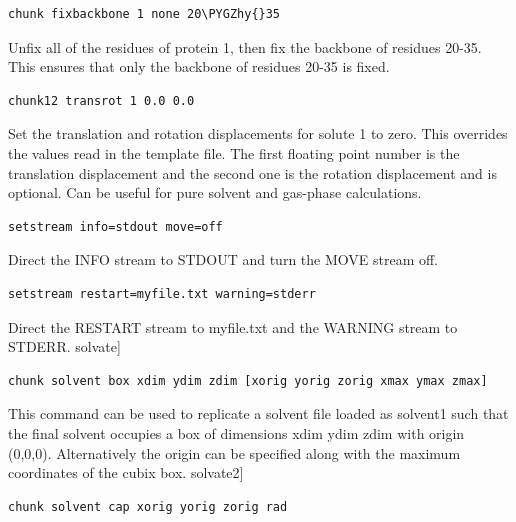\documentclass[letterpaper,10pt,english]{sphinxmanual}
\def\PYGZhy{\char`\-}
\begin{document}
\begin{Verbatim}[commandchars=\\\{\}]
chunk fixbackbone 1 none 20\PYGZhy{}35
\end{Verbatim}

Unfix all of the residues of protein 1, then fix the backbone of residues 20-35. This ensures that only the backbone of residues 20-35 is fixed.

\begin{Verbatim}[commandchars=\\\{\}]
chunk12 transrot 1 0.0 0.0
\end{Verbatim}

Set the translation and rotation displacements for solute 1 to zero. This overrides the values read in the template file. The first floating point number is the translation displacement and the second one is the rotation displacement and is optional. Can be useful for pure solvent and gas-phase calculations.

\begin{Verbatim}[commandchars=\\\{\}]
setstream info=stdout move=off
\end{Verbatim}

Direct the INFO stream to STDOUT and turn the MOVE stream off.

\begin{Verbatim}[commandchars=\\\{\}]
setstream restart=myfile.txt warning=stderr
\end{Verbatim}

Direct the RESTART stream to myfile.txt and the WARNING stream to STDERR. solvate{]}

\begin{Verbatim}[commandchars=\\\{\}]
chunk solvent box xdim ydim zdim [xorig yorig zorig xmax ymax zmax]
\end{Verbatim}

This command can be used to replicate a solvent file loaded as solvent1 such that the final solvent occupies a box of dimensions xdim ydim zdim with origin (0,0,0). Alternatively the origin can be specified along with the maximum coordinates of the cubix box. solvate2{]}

\begin{Verbatim}[commandchars=\\\{\}]
chunk solvent cap xorig yorig zorig rad
\end{Verbatim}
\end{document}

